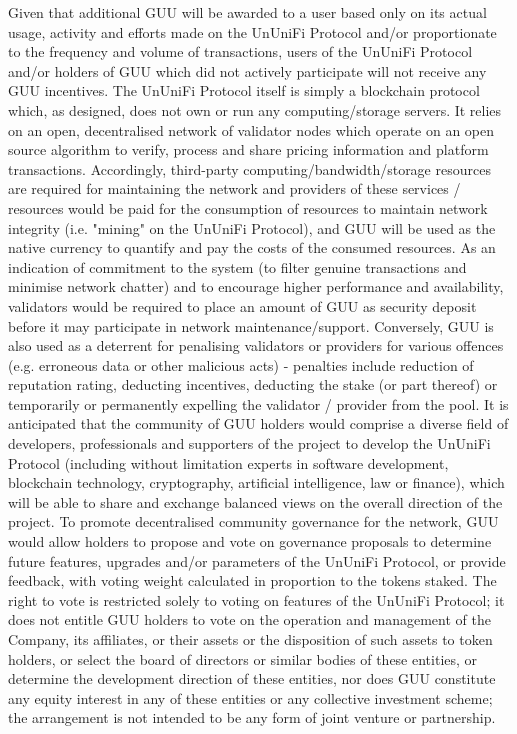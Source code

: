 \documentclass[dvipdfmx]{jsarticle}
\begin{document}
Given that additional GUU will be awarded to a user based only on its actual usage, activity and efforts made on the UnUniFi Protocol and/or proportionate to the frequency and volume of transactions, users of the UnUniFi Protocol and/or holders of GUU which did not actively participate will not receive any GUU incentives.
The UnUniFi Protocol itself is simply a blockchain protocol which, as designed, does not own or run any computing/storage servers. 
It relies on an open, decentralised network of validator nodes which operate on an open source algorithm to verify, process and share pricing information and platform transactions. 
Accordingly, third-party computing/bandwidth/storage resources are required for maintaining the network and providers of these services / resources would be paid for the consumption of resources to maintain network integrity (i.e. "mining" on the UnUniFi Protocol), and GUU will be used as the native currency to quantify and pay the costs of the consumed resources.
As an indication of commitment to the system (to filter genuine transactions and minimise network chatter) and to encourage higher performance and availability, validators would be required to place an amount of GUU as security deposit before it may participate in network maintenance/support. 
Conversely, GUU is also used as a deterrent for penalising validators or providers for various offences (e.g. erroneous data or other malicious acts) - penalties include reduction of reputation rating, deducting incentives, deducting the stake (or part thereof) or temporarily or permanently expelling the validator / provider from the pool.
It is anticipated that the community of GUU holders would comprise a diverse field of developers, professionals and supporters of the project to develop the UnUniFi Protocol (including without limitation experts in software development, blockchain technology, cryptography, artificial intelligence, law or finance), which will be able to share and exchange balanced views on the overall direction of the project. 
To promote decentralised community governance for the network, GUU would allow holders to propose and vote on governance proposals to determine future features, upgrades and/or parameters of the UnUniFi Protocol, or provide feedback, with voting weight calculated in proportion to the tokens staked. 
The right to vote is restricted solely to voting on features of the UnUniFi Protocol; it does not entitle GUU holders to vote on the operation and management of the Company, its affiliates, or their assets or the disposition of such assets to token holders, or select the board of directors or similar bodies of these entities, or determine the development direction of these entities, nor does GUU constitute any equity interest in any of these entities or any collective investment scheme; the arrangement is not intended to be any form of joint venture or partnership. 
\end{document}
